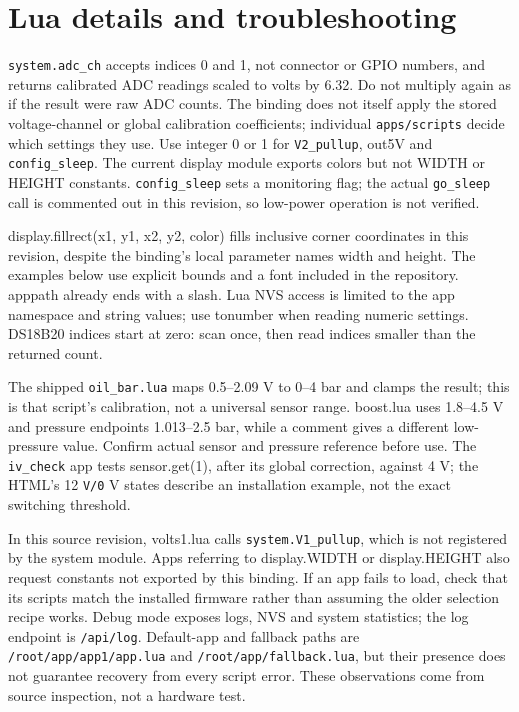 \section{Lua details and troubleshooting}
\nolinkurl{system.adc_ch} accepts indices 0 and 1, not connector or GPIO numbers, and returns calibrated ADC readings scaled to volts by 6.32. Do not multiply again as if the result were raw ADC counts. The binding does not itself apply the stored voltage-channel or global calibration coefficients; individual \nolinkurl{apps/scripts} decide which settings they use. Use integer 0 or 1 for \nolinkurl{V2_pullup}, out5V and \nolinkurl{config_sleep}. The current display module exports colors but not WIDTH or HEIGHT constants. \nolinkurl{config_sleep} sets a monitoring flag; the actual \nolinkurl{go_sleep} call is commented out in this revision, so low-power operation is not verified.

display.fillrect(x1, y1, x2, y2, color) fills inclusive corner coordinates in this revision, despite the binding's local parameter names width and height. The examples below use explicit bounds and a font included in the repository. apppath already ends with a slash. Lua NVS access is limited to the app namespace and string values; use tonumber when reading numeric settings. DS18B20 indices start at zero: scan once, then read indices smaller than the returned count.

The shipped \nolinkurl{oil_bar.lua} maps 0.5–2.09 V to 0–4 bar and clamps the result; this is that script's calibration, not a universal sensor range. boost.lua uses 1.8–4.5 V and pressure endpoints 1.013–2.5 bar, while a comment gives a different low-pressure value. Confirm actual sensor and pressure reference before use. The \nolinkurl{iv_check} app tests sensor.get(1), after its global correction, against 4 V; the HTML's 12 \nolinkurl{V/0} V states describe an installation example, not the exact switching threshold.

In this source revision, volts1.lua calls \nolinkurl{system.V1_pullup}, which is not registered by the system module. Apps referring to display.WIDTH or display.HEIGHT also request constants not exported by this binding. If an app fails to load, check that its scripts match the installed firmware rather than assuming the older selection recipe works. Debug mode exposes logs, NVS and system statistics; the log endpoint is \nolinkurl{/api/log}. Default-app and fallback paths are \nolinkurl{/root/app/app1/app.lua} and \nolinkurl{/root/app/fallback.lua}, but their presence does not guarantee recovery from every script error. These observations come from source inspection, not a hardware test.

